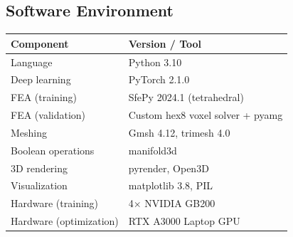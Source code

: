 \documentclass[11pt, letterpaper]{article}
\begin{document}
\subsection{Software Environment}
\begin{tabular}{ll}
  \toprule
  \textbf{Component} & \textbf{Version / Tool} \\
  \midrule
  Language & Python 3.10 \\
  Deep learning & PyTorch 2.1.0 \\
  FEA (training) & SfePy 2024.1 (tetrahedral) \\
  FEA (validation) & Custom hex8 voxel solver + pyamg \\
  Meshing & Gmsh 4.12, trimesh 4.0 \\
  Boolean operations & manifold3d \\
  3D rendering & pyrender, Open3D \\
  Visualization & matplotlib 3.8, PIL \\
  Hardware (training) & 4$\times$ NVIDIA GB200 \\
  Hardware (optimization) & RTX A3000 Laptop GPU \\
  \bottomrule
\end{tabular}
\end{document}
